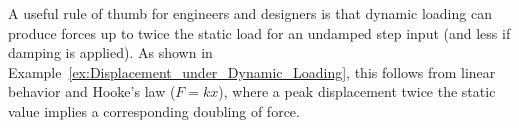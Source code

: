 \documentclass[12pt,letter]{article}
\begin{document}
\begin{example}

\end{example}

\begin{note}
	A useful rule of thumb for engineers and designers is that dynamic loading can produce forces up to twice the static load for an undamped step input (and less if damping is applied). As shown in Example~\ref{ex:Displacement_under_Dynamic_Loading}, this follows from linear behavior and Hooke's law ($F = kx$), where a peak displacement twice the static value implies a corresponding doubling of force.
\end{note}
\end{document}
